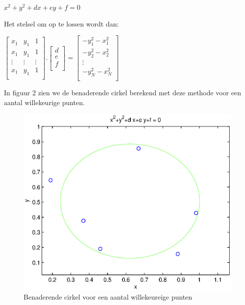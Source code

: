 \documentclass[]{article}
\begin{document}
 \begin{center}
  $x^2 + y^2 + dx +  ey + f = 0$
  \end{center}
  
  \noindent Het stelsel om op te lossen wordt dan:
   
   \begin{center}
   $
   \begin{bmatrix}
    x_{1} & y_{1} & 1 \\
    x_{1} & y_{1} & 1 \\
   \vdots & \vdots & \vdots \\
    x_{1} & y_{1} & 1 \\
   \end{bmatrix}
   .
    \begin{bmatrix}
    d\\
    e\\
    f\\
    \end{bmatrix}
    =
     \begin{bmatrix}
      -y^2_1-x^2_1\\
      -y^2_2-x^2_2\\
      \vdots\\
      -y^2_N-x^2_N\\
      \end{bmatrix}
      $
       \end{center}
 
 \noindent In figuur 2 zien we de benaderende cirkel berekend met deze methode voor een aantal willekeurige punten.
 
 \begin{figure}[h]
 \begin{center}
 \includegraphics[width=1\textwidth]{cirkel.eps}
 \end{center}
 \caption{Benaderende cirkel voor een aantal willekeureige punten}
 \end{figure}
 
\end{document}
